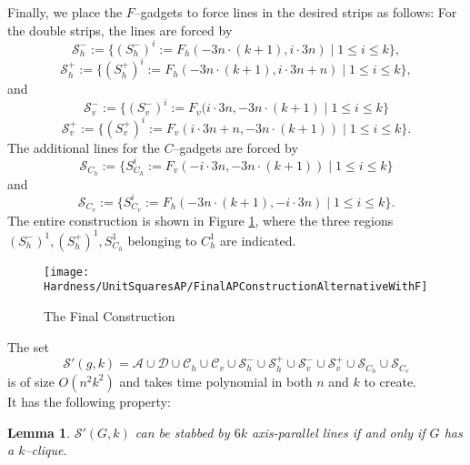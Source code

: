 \documentclass[12pt]{article}
\newtheorem{lemma}[definition]{Lemma}
\newcommand{\calS}{\mathcal{S}}
\begin{document}
Finally, we place the $F$--gadgets to force lines in the desired strips as follows: For the double strips, the lines are forced by
\[ \mathcal S_h^- := \{ (S_h^-)^i := F_h(-3n \cdot (k + 1), i \cdot 3n) \mid 1 \leq i \leq k \}, \]
\[ \mathcal S_h^+ := \{ (S_h^+)^i := F_h(-3n \cdot (k + 1), i \cdot 3n + n) \mid 1 \leq i \leq k \}, \] 
and
\[ \mathcal S_v^- := \{ (S_v^-)^i := F_v(i \cdot 3n, -3n \cdot (k + 1) \mid 1 \leq i \leq k \} \]
\[ \mathcal S_v^+ := \{ (S_v^+)^i := F_v(i \cdot 3n + n, -3n \cdot (k + 1)) \mid 1 \leq i \leq k \}. \] 
The additional lines for the $C$--gadgets are forced by
\[ \mathcal S_{C_h} := \{ S_{C_h}^i := F_v(-i \cdot 3n, -3n \cdot (k + 1)) \mid 1 \leq i \leq k \} \]
and
\[ \mathcal S_{C_v} := \{ S_{C_v}^i := F_h(-3n \cdot (k + 1), -i \cdot 3n) \mid 1 \leq i \leq k \}. \]
The entire construction is shown in Figure \ref{fig:FinalAPConstruction}, where the three regions $(S_h^-)^1, (S_h^+)^1, S_{C_h}^1$ belonging to $C_h^1$ are indicated.
\begin{figure}
	\centering
		\texttt{[image: Hardness/UnitSquaresAP/FinalAPConstructionAlternativeWithF]}
	\caption{The Final Construction}
	\label{fig:FinalAPConstruction}
\end{figure}
The set
\[ \calS'(g, k) = \mathcal A \cup \mathcal D \cup \mathcal C_h \cup \mathcal C_v \cup \mathcal S_h^- \cup \mathcal S_h^+ \cup \mathcal S_v^- \cup \mathcal S_v^+ \cup \mathcal S_{C_h} \cup \mathcal S_{C_v} \] 
is of size $O(n^2k^2)$ and takes time polynomial in both $n$ and $k$ to create.
\\
It has the following property:
\begin{lemma}
  \label{lem:mainLemma}
  $\mathcal{S}'(G,k)$ can be stabbed by $6k$ axis-parallel lines if and only if
  $G$ has a $k$--clique.
\end{lemma}
\end{document}
